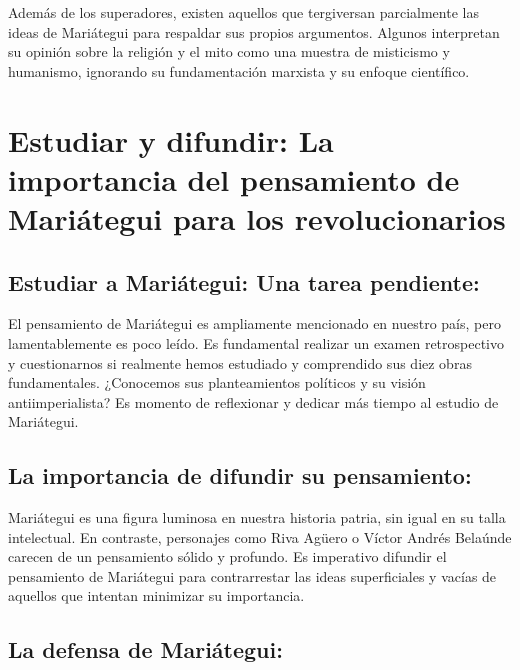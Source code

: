 \documentclass[
  a4paper,
]{article}
\begin{document}
Además de los superadores, existen aquellos que tergiversan parcialmente
las ideas de Mariátegui para respaldar sus propios argumentos. Algunos
interpretan su opinión sobre la religión y el mito como una muestra de
misticismo y humanismo, ignorando su fundamentación marxista y su
enfoque científico.

\hypertarget{estudiar-y-difundir-la-importancia-del-pensamiento-de-mariuxe1tegui-para-los-revolucionarios}{%
\section{Estudiar y difundir: La importancia del pensamiento de
Mariátegui para los
revolucionarios}\label{estudiar-y-difundir-la-importancia-del-pensamiento-de-mariuxe1tegui-para-los-revolucionarios}}

\hypertarget{estudiar-a-mariuxe1tegui-una-tarea-pendiente}{%
\subsection{Estudiar a Mariátegui: Una tarea
pendiente:}\label{estudiar-a-mariuxe1tegui-una-tarea-pendiente}}

El pensamiento de Mariátegui es ampliamente mencionado en nuestro país,
pero lamentablemente es poco leído. Es fundamental realizar un examen
retrospectivo y cuestionarnos si realmente hemos estudiado y comprendido
sus diez obras fundamentales. ¿Conocemos sus planteamientos políticos y
su visión antiimperialista? Es momento de reflexionar y dedicar más
tiempo al estudio de Mariátegui.

\hypertarget{la-importancia-de-difundir-su-pensamiento}{%
\subsection{La importancia de difundir su
pensamiento:}\label{la-importancia-de-difundir-su-pensamiento}}

Mariátegui es una figura luminosa en nuestra historia patria, sin igual
en su talla intelectual. En contraste, personajes como Riva Agüero o
Víctor Andrés Belaúnde carecen de un pensamiento sólido y profundo. Es
imperativo difundir el pensamiento de Mariátegui para contrarrestar las
ideas superficiales y vacías de aquellos que intentan minimizar su
importancia.

\hypertarget{la-defensa-de-mariuxe1tegui}{%
\subsection{La defensa de
Mariátegui:}\label{la-defensa-de-mariuxe1tegui}}
\end{document}
